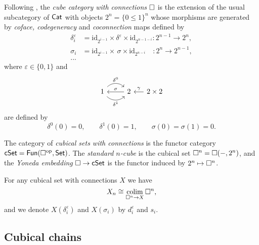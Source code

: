 Following \cite{brown1981cubes}, the \textit{cube category with connections} $\square$ is the extension of the usual subcategory of $\mathsf{Cat}$ with objects $2^n = \{0 \leq 1\}^n$ whose morphisms are generated by \textit{coface, codegeneracy} and \textit{coconnection} maps defined by
\begin{align*}
\delta_i^\varepsilon & = \mathrm{id}_{2^{i-1}} \times \delta^\varepsilon \times \mathrm{id}_{2^{n-1-i}} \colon 2^{n-1} \to 2^n, \\
\sigma_i & = \mathrm{id}_{2^{i-1}} \times \, \sigma \times \mathrm{id}_{2^{n-i}} \quad \colon 2^{n} \to 2^{n-1}, \\
... &
\end{align*}
where $\varepsilon \in \{0,1\}$ and
\begin{equation*}
\begin{tikzcd}
1 \arrow[r, out=45, in=135, "\delta^0"] \arrow[r, out=-45, in=-135, "\delta^1"'] & 2 \arrow[l, "\sigma"'] &[-10pt] \arrow[l, "\gamma"'] 2 \times 2
\end{tikzcd}
\end{equation*}
are defined by
\begin{equation*}
\delta^0(0) = 0, \qquad \delta^1(0) = 1, \qquad \sigma(0) = \sigma(1) = 0.
\end{equation*}

The category of \textit{cubical sets with connections} is the functor category $\mathsf{cSet} = \mathsf{Fun}(\square^{\mathrm{op}}, \mathsf{Set})$.
The \textit{standard $n$-cube} is the cubical set $\square^n = \square(-, 2^n)$, and the \textit{Yoneda embedding} $\square \to \mathsf{cSet}$ is the functor induced by $2^n \mapsto \square^n$.

For any cubical set with connections $X$ we have
\begin{equation*}
X_n \cong \operatorname*{colim}_{\square^n \to X} \square^n,
\end{equation*}
and we denote $X(\delta_i^\varepsilon)$ and $X(\sigma_i)$ by $d_i^\varepsilon$ and $s_i$.

\subsection{Cubical chains}

